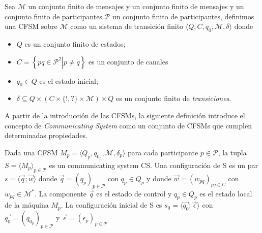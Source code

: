 \begin{definition} Sea $\mathcal{M}$ un conjunto finito de mensajes y un conjunto finito de mensajes  y un conjunto finito de participantes $\mathcal{P}$ un conjunto finito de participantes, definimos una CFSM sobre $\mathcal{M}$ como un sistema de transición finito $\langle Q, C, q_0, \mathcal{M}, \delta \rangle$ donde
\begin{itemize}
  \item $Q$ es un conjunto finito de estados;
  \item $C = \left\{ pq \in \mathcal{P}^2 \left|\right. p \not= q\right\}$ es un conjunto de canales
  \item $q_0 \in Q$ es el estado inicial;
  \item $\delta \subseteq Q \times (C \times \{!,?\} \times \mathcal{M}) \times Q$ es un conjunto finito de \emph{transiciones}.
  \end{itemize}
  
\end{definition} 

A partir de la introducción de las CFSMs, la siguiente definición introduce el concepto de \emph{Communicating System} \cite[Def.2.2]{Communicating System} como un conjunto de CFSMs que cumplen determinadas propiedades.

\begin{definition} Dada una CFSM $\textit{M}_p = \langle Q_p, q_{0_p}, \mathcal{M}, \delta_p \rangle $ para cada participante $p \in \mathcal{P}$, la tupla $S= \langle M_p \rangle_{p \in \mathcal{P}} $ es un communicating system CS.
Una configuración de S es un par $s = \langle \overrightarrow{q} ; \overrightarrow{w} \rangle$ donde $\overrightarrow{q} = (q_p)_{p \in \mathcal{P}}$ con $q_p \in Q_p$ y donde $\overrightarrow{w} = (w_{pq})_{pq \in C}$ con $ w_{pq} \in \mathcal{M}^*$. La componente $\overrightarrow{q}$ es el estado de control y $q_p \in Q_p$ es el estado local de la máquina $ M_p$. La configuración inicial de S es $s_0 = \langle \overrightarrow{q_0} ; \overrightarrow{\epsilon} \rangle$ con $\overrightarrow{q_0} = (q_{0_p})_{p \in \mathcal{P}}$ y $\overrightarrow{\epsilon} = (\epsilon_p)_{p \in \mathcal{P}}$

\end{definition}

